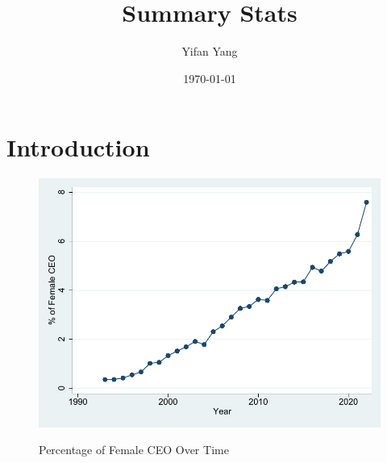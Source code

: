 \documentclass[12pt]{article}
\title{Summary Stats}
\author{Yifan Yang}
\date{\today}
\begin{document}
\maketitle

\section{Introduction}

\vfill
\begin{figure}[h]
\caption{Percentage of Female CEO Over Time \label{fig:pc_gender}}
\begin{center}
\includegraphics[width=1\textwidth]{gph/pc_gender.pdf} 
\end{center}
{\scriptsize
}
\end{figure}
\vfill
\end{document}

